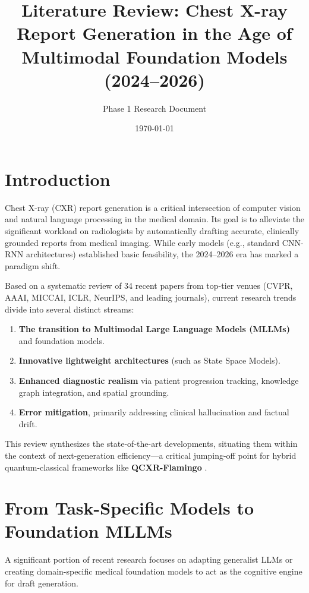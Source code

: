 \documentclass[11pt]{article}
\title{Literature Review: Chest X-ray Report Generation in the Age of Multimodal Foundation Models (2024--2026)}
\author{Phase 1 Research Document}
\date{\today}
\begin{document}
\maketitle

\section{Introduction}

Chest X-ray (CXR) report generation is a critical intersection of computer vision and natural language processing in the medical domain. Its goal is to alleviate the significant workload on radiologists by automatically drafting accurate, clinically grounded reports from medical imaging. While early models (e.g., standard CNN-RNN architectures) established basic feasibility, the 2024--2026 era has marked a paradigm shift.

Based on a systematic review of 34 recent papers from top-tier venues (CVPR, AAAI, MICCAI, ICLR, NeurIPS, and leading journals), current research trends divide into several distinct streams:
\begin{enumerate}
    \item \textbf{The transition to Multimodal Large Language Models (MLLMs)} and foundation models.
    \item \textbf{Innovative lightweight architectures} (such as State Space Models).
    \item \textbf{Enhanced diagnostic realism} via patient progression tracking, knowledge graph integration, and spatial grounding.
    \item \textbf{Error mitigation}, primarily addressing clinical hallucination and factual drift.
\end{enumerate}

This review synthesizes the state-of-the-art developments, situating them within the context of next-generation efficiency---a critical jumping-off point for hybrid quantum-classical frameworks like \textbf{QCXR-Flamingo} \cite{nimi2024qcxr}.

\section{From Task-Specific Models to Foundation MLLMs}

A significant portion of recent research focuses on adapting generalist LLMs or creating domain-specific medical foundation models to act as the cognitive engine for draft generation. 
\end{document}
